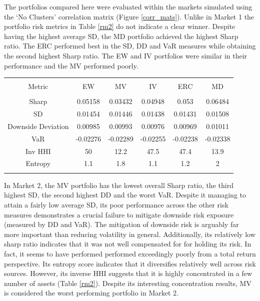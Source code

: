 \documentclass[11pt,preprint, authoryear]{elsarticle}
\let\origtable\table
\let\endorigtable\endtable
\renewenvironment{table}[1][2] {
    \expandafter\origtable\expandafter[H]
} {
    \endorigtable
}
\numberwithin{equation}{section}
\numberwithin{figure}{section}
\numberwithin{table}{section}
\begin{document}
The portfolios compared here were evaluated within the markets simulated
using the `No Clusters' correlation matrix (Figure \ref{corr_mats}).
Unlike in Market 1 the portfolio risk metrics in Table \ref{rm2} do not
indicate a clear winner. Despite having the highest average SD, the MD
portfolio achieved the highest Sharp ratio. The ERC performed best in
the SD, DD and VaR measures while obtaining the second highest Sharp
ratio. The EW and IV portfolios were similar in their performance and
the MV performed poorly.

\begin{table}[!htbp] \centering 
  \caption{Market 2 - Portfolio Risk Metrics} 
  \label{rm2} 
\begin{tabular}{@{\extracolsep{5pt}} cccccc} 
\\[-1.8ex]\hline 
\hline \\[-1.8ex] 
Metric & EW & MV & IV & ERC & MD \\ 
\hline \\[-1.8ex] 
Sharp & 0.05158 & 0.03432 & 0.04948 & 0.053 & 0.06484 \\ 
SD & 0.01454 & 0.01446 & 0.01438 & 0.01431 & 0.01508 \\ 
Downside Deviation & 0.00985 & 0.00993 & 0.00976 & 0.00969 & 0.01011 \\ 
VaR & -0.02276 & -0.02289 & -0.02255 & -0.02238 & -0.02338 \\ 
Inv HHI & 50 & 12.2 & 47.5 & 47.4 & 13.9 \\ 
Entropy & 1.1 & 1.8 & 1.1 & 1.2 & 2 \\ 
\hline \\[-1.8ex] 
\end{tabular} 
\end{table}

In Market 2, the MV portfolio has the lowest overall Sharp ratio, the
third highest SD, the second highest DD and the worst VaR. Despite it
managing to attain a fairly low average SD, its poor performance across
the other risk measures demonstrates a crucial failure to mitigate
downside risk exposure (measured by DD and VaR). The mitigation of
downside risk is arguably far more important than reducing volatility in
general. Additionally, its relatively low sharp ratio indicates that it
was not well compensated for for holding its risk. In fact, it seems to
have performed performed exceedingly poorly from a total return
perspective. Its entropy score indicates that it diversifies relatively
well across risk sources. However, its inverse HHI suggests that it is
highly concentrated in a few number of assets (Table \ref{rm2}). Despite
its interesting concentration results, MV is considered the worst
performing portfolio in Market 2.
\end{document}

